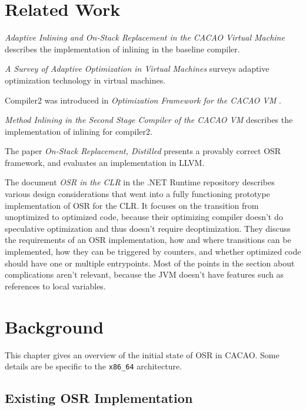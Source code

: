 \documentclass[draft,final]{vutinfth} %
\begin{document}
    \chapter{Related Work}

    \textit{Adaptive Inlining and On-Stack Replacement in the CACAO Virtual Machine}\cite{10.1145/1294325.1294356}
    describes the implementation of inlining in the baseline compiler.

    \textit{A Survey of Adaptive Optimization in Virtual Machines}\cite{AdapOptSurvey} surveys adaptive optimization technology in virtual machines.

    Compiler2 was introduced in \textit{Optimization Framework for the CACAO VM}\cite{EislJosef2013Offt} .

    \textit{Method Inlining in the Second Stage Compiler of the CACAO VM}\cite{MethodInlining} describes the implementation of inlining for compiler2.

    The paper \textit{On-Stack Replacement, Distilled}\cite{10.1145/3192366.3192396} presents a provably correct OSR framework,
    and evaluates an implementation in LLVM.

    The document \textit{OSR in the CLR}\cite{CLR-OSR} in the .NET Runtime repository describes various design considerations that
    went into a fully functioning prototype implementation of OSR for the CLR.
    It focuses on the transition from unoptimized to optimized code, because their optimizing
    compiler doesn't do speculative optimization and thus doesn't require deoptimization.
    They discuss the requirements of an OSR implementation,
    how and where transitions can be implemented,
    how they can be triggered by counters,
    and whether optimized code should have one or multiple entrypoints.
    Most of the points in the section about complications aren't relevant,
    because the JVM doesn't have features such as references to local variables.


    \chapter{Background}

    This chapter gives an overview of the initial state of OSR in CACAO.
    Some details are be specific to the \texttt{x86\_64} architecture.


    \section{Existing OSR Implementation}
\end{document}
